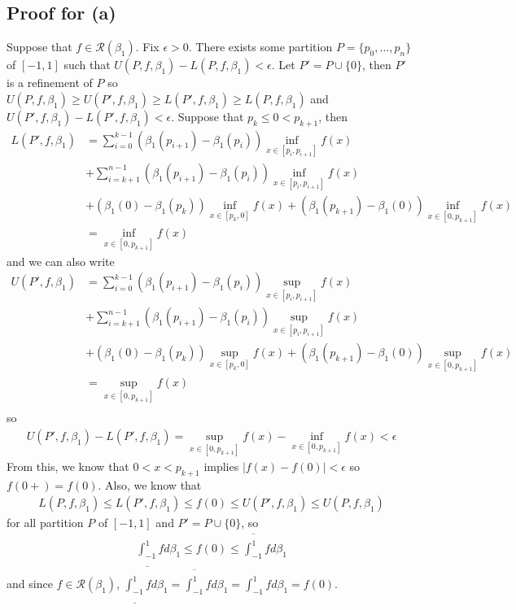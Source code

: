 \documentclass{scrartcl}
\begin{document}
\subsection{Proof for (a)}
Suppose that \(f \in \mathscr{R}(\beta_1)\).
Fix \(\epsilon > 0\).
There exists some partition \(P = \{p_0, \dots, p_n\}\) of \([-1, 1]\) such that \(U(P, f, \beta_1) - L(P, f, \beta_1) < \epsilon\).
Let \(P' = P \cup \{0\}\), then \(P'\) is a refinement of \(P\) so \(U(P, f, \beta_1) \geq U(P', f, \beta_1) \geq L(P', f, \beta_1) \geq L(P, f, \beta_1)\) and \(U(P', f, \beta_1) - L(P', f, \beta_1) < \epsilon\).
Suppose that \(p_k \leq 0 < p_{k + 1}\), then
\begin{align*}
  L(P', f, \beta_1)
  &= \sum^{k - 1}_{i = 0} (\beta_1(p_{i + 1}) - \beta_1(p_i)) \inf_{x \in [p_i, p_{i + 1}]} f(x) \\
  &+ \sum^{n - 1}_{i = k + 1} (\beta_1(p_{i + 1}) - \beta_1(p_i)) \inf_{x \in [p_i, p_{i + 1}]} f(x) \\
  &+ (\beta_1(0) - \beta_1(p_k)) \inf_{x \in [p_k, 0]} f(x)
  + (\beta_1(p_{k + 1}) - \beta_1(0)) \inf_{x \in [0, p_{k + 1}]} f(x) \\
  &= \inf_{x \in [0, p_{k + 1}]} f(x)
\end{align*}
and we can also write
\begin{align*}
  U(P', f, \beta_1)
  &= \sum^{k - 1}_{i = 0} (\beta_1(p_{i + 1}) - \beta_1(p_i)) \sup_{x \in [p_i, p_{i + 1}]} f(x) \\
  &+ \sum^{n - 1}_{i = k + 1} (\beta_1(p_{i + 1}) - \beta_1(p_i)) \sup_{x \in [p_i, p_{i + 1}]} f(x) \\
  &+ (\beta_1(0) - \beta_1(p_k)) \sup_{x \in [p_k, 0]} f(x)
  + (\beta_1(p_{k + 1}) - \beta_1(0)) \sup_{x \in [0, p_{k + 1}]} f(x) \\
  &= \sup_{x \in [0, p_{k + 1}]} f(x) \\
\end{align*}
so
\begin{align*}
  U(P', f, \beta_1) - L(P', f, \beta_1)
  = \sup_{x \in [0, p_{k + 1}]} f(x) - \inf_{x \in [0, p_{k + 1}]} f(x) < \epsilon
\end{align*}
From this, we know that \(0 < x < p_{k + 1}\) implies \(|f(x) - f(0)| < \epsilon\) so \(f(0+) = f(0)\).
Also, we know that
\begin{align*}
  L(P, f, \beta_1) \leq L(P', f, \beta_1) \leq f(0) \leq U(P', f, \beta_1) \leq U(P, f, \beta_1)
\end{align*}
for all partition \(P\) of \([-1, 1]\) and \(P' = P \cup \{0\}\), so
\begin{align*}
  \underline{\int^1_{-1}} f d\beta_1 \leq f(0) \leq \overline{\int^1_{-1}} f d\beta_1
\end{align*}
and since \(f \in \mathscr{R}(\beta_1)\), \(\underline{\int^1_{-1}} f d\beta_1 = \overline{\int^1_{-1}} f d\beta_1 = \int^1_{-1} f d\beta_1 = f(0)\).
\end{document}
